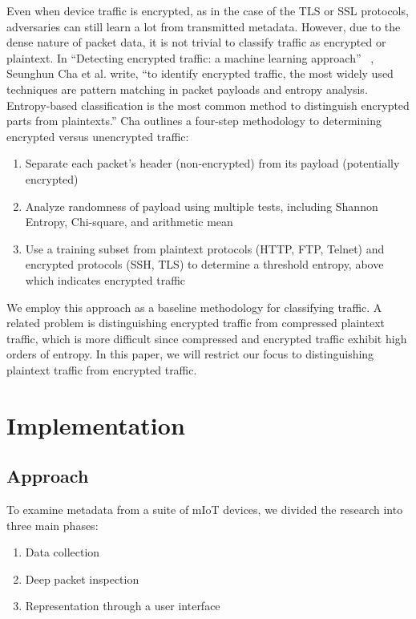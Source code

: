 Even when device traffic is encrypted, as in the case of the TLS or SSL protocols, adversaries can still learn a lot from transmitted metadata. However, due to the dense nature of packet data, it is not trivial to classify traffic as encrypted or plaintext. In ``Detecting encrypted traffic: a machine learning approach'' ~\cite{chaMachineLearning}, Seunghun Cha et al. write, ``to identify encrypted traffic, the most widely used techniques are pattern matching in packet payloads and entropy analysis. Entropy-based classification is the most common method to distinguish encrypted parts from plaintexts.'' Cha outlines a four-step methodology to determining encrypted versus unencrypted traffic:

\begin{enumerate}
  \item Separate each packet's header (non-encrypted) from its payload (potentially encrypted)
  \item Analyze randomness of payload using multiple tests, including Shannon Entropy, Chi-square, and arithmetic mean
  \item Use a training subset from plaintext protocols (HTTP, FTP, Telnet) and encrypted protocols (SSH, TLS) to determine a threshold entropy, above which indicates encrypted traffic
\end{enumerate}

We employ this approach as a baseline methodology for classifying traffic. A related problem is distinguishing encrypted traffic from compressed plaintext traffic, which is more difficult since compressed and encrypted traffic exhibit high orders of entropy. In this paper, we will restrict our focus to distinguishing plaintext traffic from encrypted traffic.  

\section{Implementation}

\subsection{Approach}

To examine metadata from a suite of mIoT devices, we divided the research into three main phases: 

\begin{enumerate}
  \item Data collection
  \item Deep packet inspection
  \item Representation through a user interface
\end{enumerate}

